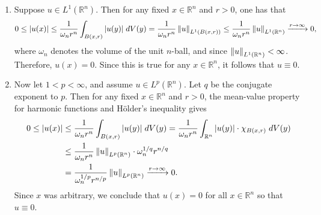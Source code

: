 \documentclass{article}
\begin{document}
	\begin{enumerate}[itemsep =-2pt,label = (\alph{*})]
		\item Suppose $u \in L^{1}(\mathbb{R}^{n})$. Then for any fixed $x \in \mathbb{R}^{n}$ and $r > 0$, one has that 
		\begin{equation*}
			0 \leq |u(x)| \leq \frac{1}{\omega_{n}r^{n}}\int_{B(x,r)}|u(y)|\;dV(y) = \frac{1}{\omega_{n}r^{n}}\left\Vert u \right\Vert_{L^{1}(B(x,r))} \leq \frac{1}{\omega_{n}r^{n}}\left\Vert u \right\Vert_{L^{1}(\mathbb{R}^{n})} \xrightarrow{r \to \infty} 0, 
		\end{equation*}
		where $\omega_{n}$ denotes the volume of the unit $n$-ball, and since $\left\Vert u \right\Vert_{L^{1}(\mathbb{R}^{n})} < \infty$. Therefore, $u(x) = 0$. Since this is true for any $x \in \mathbb{R}^{n}$, it follows that $u \equiv 0$. 
		\item Now let $1 < p < \infty$, and assume $u \in L^{p}(\mathbb{R}^{n})$. Let $q$ be the conjugate exponent to $p$. Then for any fixed $x \in \mathbb{R}^{n}$ and $r > 0$, the mean-value property for harmonic functions and H\"older's inequality gives 
		\begin{align*}
			\begin{split}
				0 \leq |u(x)| &\leq \frac{1}{\omega_{n}r^{n}}\int_{B(x, r)}|u(y)|\;dV(y) = \frac{1}{\omega_{n}r^{n}}\int_{\mathbb{R}^{n}}|u(y)|\cdot \chi_{B(x, r)}\;dV(y) \\
				&\leq \frac{1}{\omega_{n}r^{n}}\left\Vert u \right\Vert_{L^{p}(\mathbb{R}^{n})} \cdot \omega_{n}^{1/q}r^{n/q} \\
				&= \frac{1}{\omega_{n}^{1/p}r^{n/p}}\left\Vert u \right\Vert_{L^{p}(\mathbb{R}^{n})} \xrightarrow{r \to \infty} 0. 
			\end{split}
		\end{align*}
		Since $x$ was arbitrary, we conclude that $u(x) = 0$ for all $x \in \mathbb{R}^{n}$ so that $u \equiv 0$. 
	\end{enumerate}
	
\end{document}
